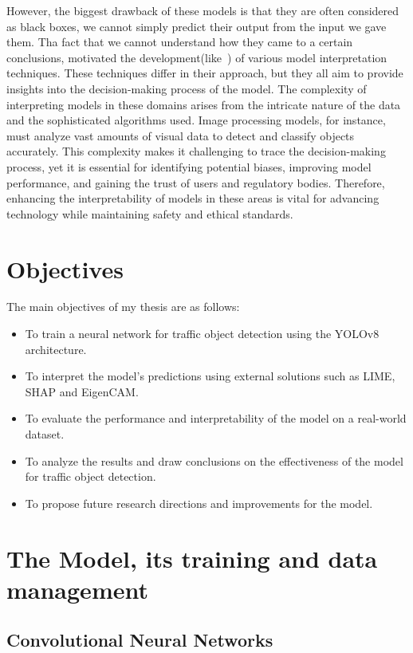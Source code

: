 \documentclass[11pt,a4paper,twoside,openright]{report}  %
\begin{document}
However, the biggest drawback of these models is that they are often considered as black boxes,
we cannot simply predict their output from the input we gave them.
Tha fact that we cannot understand how they came to a certain conclusions, motivated the development(like~\cite{LIANG2021168})  of various model interpretation techniques.
These techniques differ in their approach, but they all aim to provide insights into the decision-making process of the model.
The complexity of interpreting models in these domains arises from the intricate nature of the data and the sophisticated algorithms used.
Image processing models, for instance, must analyze vast amounts of visual data to detect and classify objects accurately.
This complexity makes it challenging to trace the decision-making process, yet it is essential for identifying potential biases,
improving model performance, and gaining the trust of users and regulatory bodies.
Therefore, enhancing the interpretability of models in these areas is vital for advancing technology while
maintaining safety and ethical standards.


\section{Objectives}\label{sec:objectives}

The main objectives of my thesis are as follows:

\begin{itemize}
    \item To train a neural network  for traffic object detection using the YOLOv8 architecture.
    \item To interpret the model's predictions using external solutions such as LIME, SHAP and EigenCAM.
    \item To evaluate the performance and interpretability of the model on a real-world dataset.
    \item To analyze the results and draw conclusions on the effectiveness of the model for traffic object detection.
    \item To propose future research directions and improvements for the model.
\end{itemize}

\section[Model, training and data management]{The Model, its training and data management} \label{sec:model-training-data}
\subsection{Convolutional Neural Networks}\label{subsec:convolutional-neural-networks}
\end{document}
